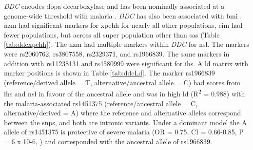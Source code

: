\documentclass[]{report}
\begin{document}
\emph{DDC} encodes dopa decarboxylase and has been nominally associated
at a genome-wide threshold with malaria \citep{jallow2009genome}.
\emph{DDC} has also been associated with \gls{bmi} \citep{Locke2015}.
\Gls{nzm} had significant markers for \gls{xpehh} for nearly all other
populations, \gls{cim} had fewer populations, but across all super
population other than \gls{sas} (Table \ref{tab:ddcxpehh}). The
\gls{nzm} had multiple markers within \emph{DDC} for \gls{nsl}. The
markers were rs2060762, rs3807558, rs2329371, and rs1966839. The same
markers in addition with rs11238131 and rs4580999 were significant for
\gls{ihs}. A \gls{ld} matrix with marker positions is shown in Table
\ref{tab:ddcLd}. The marker rs1966839 (reference/derived allele = T,
alternative/ancestral allele = C) had scores from \gls{ihs} and
\gls{nsl} in favour of the ancestral allele and was in high \gls{ld}
(R\textsuperscript{2} = 0.988) with the malaria-associated rs1451375
(reference/ancestral allele = C, alternative/derived = A) where the
reference and alternative alleles correspond between the \glspl{snp},
and both are intronic variants. Under a dominant model the A allele of
rs1451375 is protective of severe malaria (OR = 0.75, CI = 0.66-0.85, P
= 6 x 10-6, \citet{jallow2009genome}) and corresponded with the
ancestral allele of rs1966839.
\end{document}

